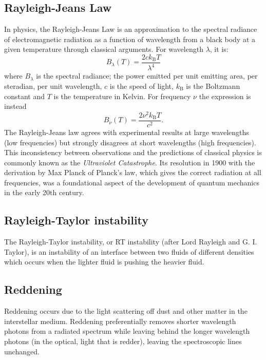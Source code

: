 \documentclass[11pt]{article}
\begin{document}
\subsection*{Rayleigh-Jeans Law}
In physics, the Rayleigh-Jeans Law is an approximation to the spectral
radiance of electromagnetic radiation as a function of wavelength from
a black body at a given temperature through classical arguments. For
wavelength $\lambda$, it is:
\begin{equation}
B_{\lambda }(T)={\frac {2ck_{\mathrm {B} }T}{\lambda ^{4}}} 
\end{equation}
where $B_{\lambda }$ is the spectral radiance; the power emitted per
unit emitting area, per steradian, per unit wavelength, $c$ is the speed of light, 
$k_{\mathrm {B}}$ is the Boltzmann constant and $T$ is 
the temperature in Kelvin. For frequency $\nu$
the expression is instead
\begin{equation}
B_{\nu }(T)={\frac {2\nu ^{2}k_{\mathrm {B} }T}{c^{2}}}.
\end{equation}
The Rayleigh-Jeans law agrees with experimental results at large
wavelengths (low frequencies) but strongly disagrees at short
wavelengths (high frequencies). This inconsistency between
observations and the predictions of classical physics is commonly
known as the {\it Ultraviolet Catastrophe}. Its resolution in 1900
with the derivation by Max Planck of Planck's law, which gives the
correct radiation at all frequencies, was a foundational aspect of the
development of quantum mechanics in the early 20th century.

\subsection*{Rayleigh-Taylor instability}
The Rayleigh-Taylor instability, or RT instability (after Lord
Rayleigh and G. I. Taylor), is an instability of an interface between
two fluids of different densities which occurs when the lighter fluid
is pushing the heavier fluid.


\subsection*{Reddening}
Reddening occurs due to the light scattering off dust and other matter in the interstellar medium. 
Reddening preferentially removes shorter wavelength photons from a radiated spectrum while leaving behind the longer wavelength photons (in the optical, light that is redder), leaving the spectroscopic lines unchanged.
\end{document}
